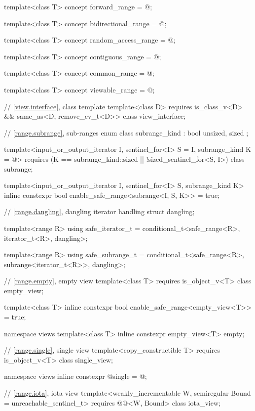 \begin{codeblock}
{  template<class T>
    concept forward_range = @\seebelow@;

  template<class T>
    concept bidirectional_range = @\seebelow@;

  template<class T>
    concept random_access_range = @\seebelow@;

  template<class T>
    concept contiguous_range = @\seebelow@;

  template<class T>
    concept common_range = @\seebelow@;

  template<class T>
    concept viewable_range = @\seebelow@;

  // \ref{view.interface}, class template 
  template<class D>
    requires is_class_v<D> && same_as<D, remove_cv_t<D>>
  class view_interface;

  // \ref{range.subrange}, sub-ranges
  enum class subrange_kind : bool { unsized, sized };

  template<input_or_output_iterator I, sentinel_for<I> S = I, subrange_kind K = @\seebelow@>
    requires (K == subrange_kind::sized || !sized_sentinel_for<S, I>)
  class subrange;

  template<input_or_output_iterator I, sentinel_for<I> S, subrange_kind K>
    inline constexpr bool enable_safe_range<subrange<I, S, K>> = true;

  // \ref{range.dangling}, dangling iterator handling
  struct dangling;

  template<range R>
    using safe_iterator_t = conditional_t<safe_range<R>, iterator_t<R>, dangling>;

  template<range R>
    using safe_subrange_t =
      conditional_t<safe_range<R>, subrange<iterator_t<R>>, dangling>;

  // \ref{range.empty}, empty view
  template<class T>
    requires is_object_v<T>
  class empty_view;

  template<class T>
    inline constexpr bool enable_safe_range<empty_view<T>> = true;

  namespace views {
    template<class T>
      inline constexpr empty_view<T> empty{};
  }

  // \ref{range.single}, single view
  template<copy_constructible T>
    requires is_object_v<T>
  class single_view;

  namespace views { inline constexpr @\unspec@ single = @\unspec@; }

  // \ref{range.iota}, iota view
  template<weakly_incrementable W, semiregular Bound = unreachable_sentinel_t>
    requires @@<W, Bound>
  class iota_view;

}
\end{codeblock}
